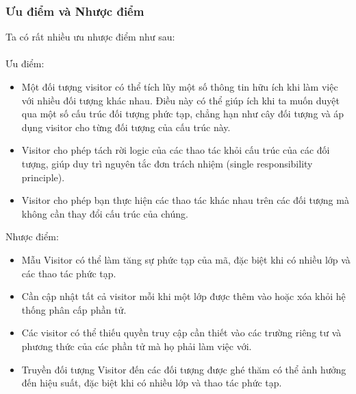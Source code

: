 \subsubsection{Ưu điểm và Nhược điểm}
Ta có rất nhiều ưu nhược điểm như sau:\\\\
Ưu điểm:
\begin{itemize}
    \item Một đối tượng visitor có thể tích lũy một số thông tin hữu ích khi làm việc với nhiều đối tượng khác nhau. Điều này có thể giúp ích khi ta muốn duyệt qua một số cấu trúc đối tượng phức tạp, chẳng hạn như cây đối tượng và áp dụng visitor cho từng đối tượng của cấu trúc này.
    \item Visitor cho phép tách rời logic của các thao tác khỏi cấu trúc của các đối tượng, giúp duy trì nguyên tắc đơn trách nhiệm (single responsibility principle).
    \item Visitor cho phép bạn thực hiện các thao tác khác nhau trên các đối tượng mà không cần thay đổi cấu trúc của chúng.
\end{itemize}
Nhược điểm:
\begin{itemize}
    \item Mẫu Visitor có thể làm tăng sự phức tạp của mã, đặc biệt khi có nhiều lớp và các thao tác phức tạp.
    \item Cần cập nhật tất cả visitor mỗi khi một lớp được thêm vào hoặc xóa khỏi hệ thống phân cấp phần tử.
    \item Các visitor có thể thiếu quyền truy cập cần thiết vào các trường riêng tư và phương thức của các phần tử mà họ phải làm việc với.
    \item Truyền đối tượng Visitor đến các đối tượng được ghé thăm có thể ảnh hưởng đến hiệu suất, đặc biệt khi có nhiều lớp và thao tác phức tạp.
\end{itemize}
